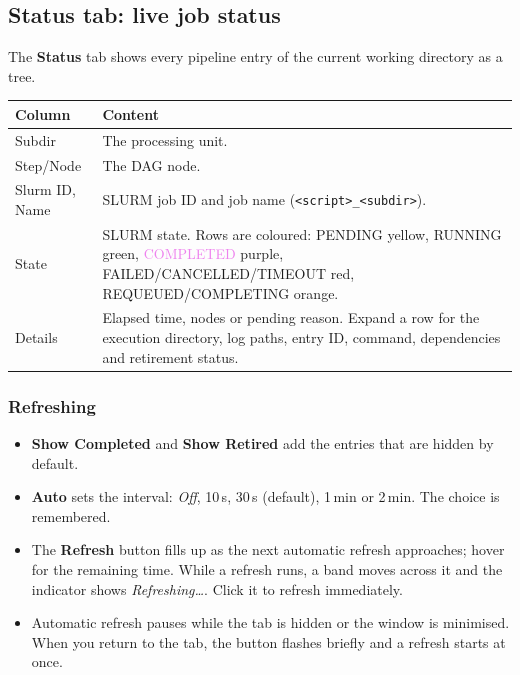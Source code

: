 \documentclass[11pt,a4paper]{article}
\newcommand{\cmd}[1]{\texttt{#1}}
\newcommand{\ui}[1]{\textsf{\textbf{#1}}}
\begin{document}
\subsection{Status tab: live job status}\label{sec:status}

The \ui{Status} tab shows every pipeline entry of the current working directory as a tree.

\begin{center}
\begin{tabularx}{\linewidth}{@{}l>{\raggedright\arraybackslash}X@{}}
\toprule
Column & Content \\
\midrule
Subdir & The processing unit. \\
Step/Node & The DAG node. \\
Slurm ID, Name & SLURM job ID and job name (\cmd{<script>\_<subdir>}). \\
State & SLURM state. Rows are coloured: \textcolor{orange!80!black}{PENDING} yellow, \textcolor{green!50!black}{RUNNING} green, \textcolor{violet}{COMPLETED} purple, \textcolor{red!70!black}{FAILED/CANCELLED/TIMEOUT} red, REQUEUED/COMPLETING orange. \\
Details & Elapsed time, nodes or pending reason. Expand a row for the execution directory, log paths, entry ID, command, dependencies and retirement status. \\
\bottomrule
\end{tabularx}
\end{center}

\subsubsection*{Refreshing}

\begin{itemize}
  \item \ui{Show Completed} and \ui{Show Retired} add the entries that are hidden by default.
  \item \ui{Auto} sets the interval: \emph{Off}, 10\,s, 30\,s (default), 1\,min or 2\,min. The choice is remembered.
  \item The \ui{Refresh} button fills up as the next automatic refresh approaches; hover for the
    remaining time. While a refresh runs, a band moves across it and the indicator shows
    \emph{Refreshing\ldots}. Click it to refresh immediately.
  \item Automatic refresh pauses while the tab is hidden or the window is minimised. When you
    return to the tab, the button flashes briefly and a refresh starts at once.
\end{itemize}
\end{document}
